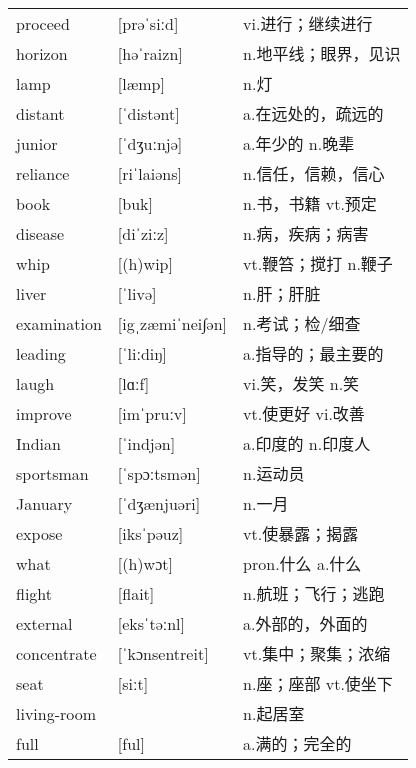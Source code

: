 \documentclass[a4paper]{article}
\begin{document}
\section{}
\begin{tabular}{l l l}

proceed & [prəˈsiːd] & vi.进行；继续进行 \\
horizon & [həˈraizn] & n.地平线；眼界，见识 \\
lamp & [læmp] & n.灯 \\
distant & [ˈdistənt] & a.在远处的，疏远的 \\
junior & [ˈdʒuːnjə] & a.年少的 n.晚辈 \\
reliance & [riˈlaiəns] & n.信任，信赖，信心 \\
book & [buk] & n.书，书籍 vt.预定 \\
disease & [diˈziːz] & n.病，疾病；病害 \\
whip & [(h)wip] & vt.鞭笞；搅打 n.鞭子 \\
liver & [ˈlivə] & n.肝；肝脏 \\
examination & [igˌzæmiˈnei∫ən] & n.考试；检/细查 \\
leading & [ˈliːdiŋ] & a.指导的；最主要的 \\
laugh & [lɑːf] & vi.笑，发笑 n.笑 \\
improve & [imˈpruːv] & vt.使更好 vi.改善 \\
Indian & [ˈindjən] & a.印度的 n.印度人 \\
sportsman & [ˈspɔːtsmən] & n.运动员 \\
January & [ˈdʒænjuəri] & n.一月 \\
expose & [iksˈpəuz] & vt.使暴露；揭露 \\
what & [(h)wɔt] & pron.什么 a.什么 \\
flight & [flait] & n.航班；飞行；逃跑 \\
external & [eksˈtəːnl] & a.外部的，外面的 \\
concentrate & [ˈkɔnsentreit] & vt.集中；聚集；浓缩 \\
seat & [siːt] & n.座；座部 vt.使坐下 \\
living-room &  & n.起居室 \\
full & [ful] & a.满的；完全的 \\

\end{tabular}
\end{document}

